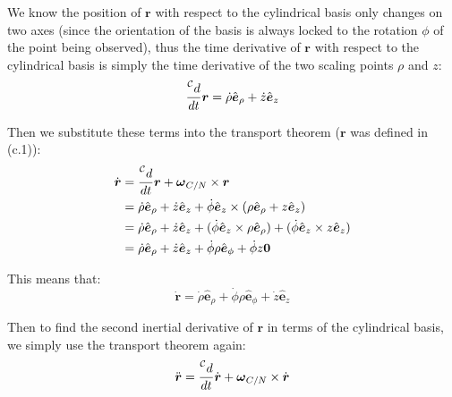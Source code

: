 \documentclass[titlepage]{article}
\begin{document}
We know the position of $\boldsymbol{r}$ with respect to the cylindrical basis only changes on two axes (since the orientation of the basis is always locked to the rotation $\phi$ of the point being observed), thus the time derivative of $\boldsymbol{r}$ with respect to the cylindrical basis is simply the time derivative of the two scaling points $\rho$ and $z$:
\begin{equation}
	\frac{\prescript{\mathcal{C}}{}{d}}{dt}\boldsymbol{r}=\dot{\rho}\hat{\boldsymbol{e}}_{\rho}+\dot{z}\hat{\boldsymbol{e}}_z
\end{equation}

Then we substitute these terms into the transport theorem ($\boldsymbol{r}$ was defined in (c.1)):
\begin{equation}
	\begin{split}
		\dot{\boldsymbol{r}}&=\frac{\prescript{\mathcal{C}}{}{d}}{dt}\boldsymbol{r}+\boldsymbol{\omega}_{C/N}\times\boldsymbol{r}\\
		&=\dot{\rho}\hat{\boldsymbol{e}}_{\rho}+\dot{z}\hat{\boldsymbol{e}}_z+\dot{\phi}\hat{\boldsymbol{e}}_z\times(\rho\hat{\boldsymbol{e}}_{\rho}+z\hat{\boldsymbol{e}}_z)\\
		&=\dot{\rho}\hat{\boldsymbol{e}}_{\rho}+\dot{z}\hat{\boldsymbol{e}}_z+(\dot{\phi}\hat{\boldsymbol{e}}_z\times\rho\hat{\boldsymbol{e}}_{\rho})+(\dot{\phi}\hat{\boldsymbol{e}}_z\times z\hat{\boldsymbol{e}}_z)\\
		&=\dot{\rho}\hat{\boldsymbol{e}}_{\rho}+\dot{z}\hat{\boldsymbol{e}}_z+\dot{\phi}\rho\hat{\boldsymbol{e}}_{\phi}+\dot{\phi}z\boldsymbol{0}\\
	\end{split}
\end{equation}

\begin{mdframed}[linewidth=1pt, innertopmargin=10pt, innerbottommargin=10pt]
	This means that:
	\begin{equation}
			\dot{\boldsymbol{r}}=\dot{\rho}\hat{\boldsymbol{e}}_{\rho}+\dot{\phi}\rho\hat{\boldsymbol{e}}_{\phi}+\dot{z}\hat{\boldsymbol{e}}_z
	\end{equation}
\end{mdframed}

Then to find the second inertial derivative of $\boldsymbol{r}$ in terms of the cylindrical basis, we simply use the transport theorem again:
\begin{equation}
	\ddot{\boldsymbol{r}}=\frac{\prescript{\mathcal{C}}{}{d}}{dt}\dot{\boldsymbol{r}}+\boldsymbol{\omega}_{C/N}\times\dot{\boldsymbol{r}}
\end{equation}
\end{document}
